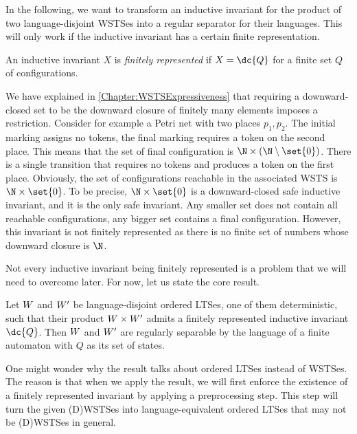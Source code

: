 \documentclass[../../diss.tex]{subfiles}
\begin{document}
In the following, we want to transform an inductive invariant for the product of two language-disjoint WSTSes into a regular separator for their languages.
This will only work if the inductive invariant has a certain finite representation.

\begin{definition}
    An inductive invariant $X$ is \emph{finitely represented} if $X = \dc{Q}$ for a finite set $Q$ of configurations.
\end{definition}

We have explained in \cref{Chapter:WSTSExpressiveness} that requiring a downward-closed set to be the downward closure of finitely many elements imposes a restriction.
Consider for example a Petri net with two places $p_1, p_2$.
The initial marking assigns no tokens, the final marking requires a token on the second place.
This means that the set of final configuration is $\N \times (\N \setminus \set{0})$.
There is a single transition that requires no tokens and produces a token on the first place.
Obviously, the set of configurations reachable in the associated WSTS is $\N \times \set{0}$.
To be precise, $\N \times \set{0}$ is a downward-closed safe inductive invariant, and it is the only safe invariant.
Any smaller set does not contain all reachable configurations, any bigger set contains a final configuration.
However, this invariant is not finitely represented as there is no finite set of numbers whose downward closure is $\N$.

Not every inductive invariant being finitely represented is a problem that we will need to overcome later.
For now, let us state the core result.

\begin{theorem}%
\label{Theorem:WSTSSeparabilityCore}%
    Let $W$ and $W'$ be language-disjoint ordered LTSes, one of them deterministic, such that their product $W \times W'$ admits a finitely represented inductive invariant $\dc{Q}$.
    Then $W$ and $W'$ are regularly separable by the language of a finite automaton with $Q$ as its set of states.
\end{theorem}

One might wonder why the result talks about ordered LTSes instead of WSTSes.
The reason is that when we apply the result, we will first enforce the existence of a finitely represented invariant by applying a preprocessing step.
This step will turn the given (D)WSTSes into language-equivalent ordered LTSes that may not be (D)WSTSes in general.
\end{document}

